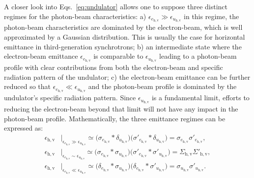 \begin{refsection}
A closer look into Eqs.~\ref{eq:undulator} allows one to suppose three distinct regimes for the photon-beam characteristics: a) $\epsilon_{e_{\mathrm{h,v}}}\gg\epsilon_{u_{\mathrm{h,v}}}$ in this regime, the photon-beam characteristics are dominated by the electron-beam, which is well approximated by a Gaussian distribution. This is usually the case for horizontal emittance in third-generation synchrotrons; b) an intermediate state where the electron-beam emittance $\epsilon_{e_{\mathrm{h,v}}}$ is comparable to $\epsilon_{u_{\mathrm{h,v}}}$ leading to a photon-beam profile with clear contributions from both the electron-beam and specific radiation pattern of the undulator; c) the electron-beam emittance can be further reduced so that $\epsilon_{e_{\mathrm{h,v}}}\ll\epsilon_{u_{\mathrm{h,v}}}$ and the photon-beam profile is dominated by the undulator's specific radiation pattern. Since $\epsilon_{u_{\mathrm{h,v}}}$ is a fundamental limit, efforts to reducing the electron-beam beyond that limit will not have any impact in the photon-beam profile. Mathematically, the three emittance regimes can be expressed as:
\begin{subequations}\label{eq:emittances}
    \begin{align}
           \epsilon_{\mathrm{h,v}}&\Big\vert_{\epsilon_{e_{\mathrm{h,v}}}\gg\epsilon_{u_{\mathrm{h,v}}}}  \simeq\Big(\sigma_{e_{\mathrm{h,v}}}*\delta_{u_{\mathrm{h,v}}}\Big)\Big(\sigma'_{e_{\mathrm{h,v}}}*\delta_{u_{\mathrm{h,v}}}\Big)=\sigma_{e_{\mathrm{h,v}}}\sigma'_{e_{\mathrm{h,v}}},\\
           \epsilon_{\mathrm{h,v}}&\Big\vert_{\epsilon_{e_{\mathrm{h,v}}}\sim\epsilon_{u_{\mathrm{h,v}}}}
           \simeq\Big(\sigma_{e_{\mathrm{h,v}}}*\sigma_{u_{\mathrm{h,v}}}\Big)\Big(\sigma'_{e_{\mathrm{h,v}}}*\sigma'_{u_{\mathrm{h,v}}}\Big)=\Sigma_{\mathrm{h,v}}\Sigma'_{\mathrm{h,v}},\\
           \epsilon_{\mathrm{h,v}}&\Big\vert_{\epsilon_{e_{\mathrm{h,v}}}\ll\epsilon_{u_{\mathrm{h,v}}}}
           \simeq \Big(\delta_{e_{\mathrm{h,v}}}*\sigma_{u_{\mathrm{h,v}}}\Big)\Big(\delta_{e_{\mathrm{h,v}}}*\sigma'_{u_{\mathrm{h,v}}}\Big)=\sigma_{u_{\mathrm{h,v}}}\sigma'_{u_{\mathrm{h,v}}}.
    \end{align}
\end{subequations}{}

\end{refsection}
